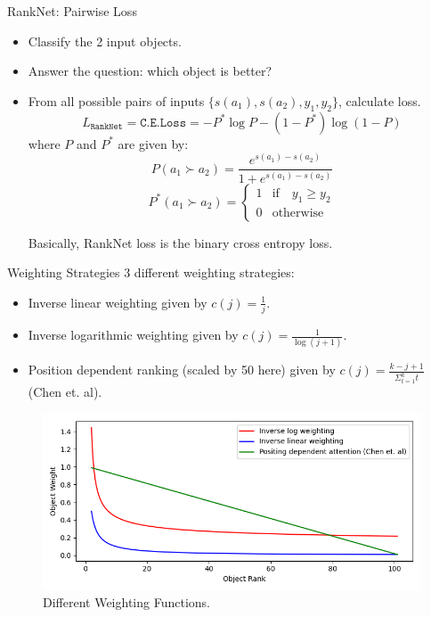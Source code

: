 \documentclass{beamer}
\begin{document}
\begin{frame}[t]{RankNet: Pairwise Loss}

\begin{itemize}
\item Classify the 2 input objects.
\item Answer the question: which object is better?
\item From all possible pairs of inputs $\{s(a_1), s(a_2), y_1, y_2\}$,  calculate loss.
$$
L_{\texttt{RankNet}} = \texttt{C.E.Loss} = -P^*\log P - (1 - P^*)\log(1-P)
$$
where $P$ and $P^*$ are given by:
$$
P(a_1 \succ a_2) = \frac{e^{s(a_1) - s(a_2)}}{1 + e^{s(a_1) - s(a_2)} }
$$
$$
P^*(a_1 \succ a_2) =
\begin{cases}
      1 & \text{if} \quad y_1 \geq y_2 \\
      0 &  \text{otherwise}
\end{cases}       
$$

Basically,  RankNet loss is the binary cross entropy loss.
\end{itemize}


\end{frame}

\begin{frame}[t]{Weighting Strategies}
3 different weighting strategies:
\begin{itemize}
\item Inverse linear weighting given by $c(j) = \frac{1}{j}$.
\item Inverse logarithmic weighting given by $c(j) = \frac{1}{\log (j+1)}$.
\item Position dependent ranking (scaled by 50 here) given by $c(j) = \frac{k - j + 1}{\Sigma_{t=1}^k t}$ (Chen et. al).
\end{itemize}

\begin{figure}[htb]
  \centering
    \includegraphics[scale=0.3]{images/weightingfunctions}
    \caption{Different Weighting Functions.}
    \label{fig:weightingfunctions}
\end{figure}

\end{frame}
\end{document}
